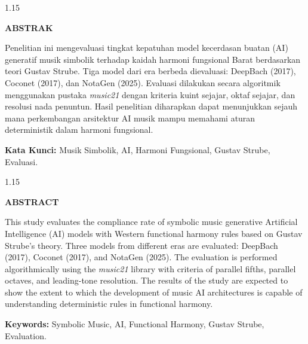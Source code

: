 \newpage
\begin{spacing}{1.15}
\begin{center}
    \textbf{ABSTRAK}
\end{center}

Penelitian ini mengevaluasi tingkat kepatuhan model kecerdasan buatan (AI) generatif musik simbolik terhadap kaidah harmoni fungsional Barat berdasarkan teori Gustav Strube. Tiga model dari era berbeda dievaluasi: DeepBach (2017), Coconet (2017), dan NotaGen (2025). Evaluasi dilakukan secara algoritmik menggunakan pustaka \textit{music21} dengan kriteria kuint sejajar, oktaf sejajar, dan resolusi nada penuntun. Hasil penelitian diharapkan dapat menunjukkan sejauh mana perkembangan arsitektur AI musik mampu memahami aturan deterministik dalam harmoni fungsional.\par

\textbf{Kata Kunci:} Musik Simbolik, AI, Harmoni Fungsional, Gustav Strube, Evaluasi.
\end{spacing}

\newpage
\begin{spacing}{1.15}
\begin{center}
    \textbf{ABSTRACT}
\end{center}

This study evaluates the compliance rate of symbolic music generative Artificial Intelligence (AI) models with Western functional harmony rules based on Gustav Strube's theory. Three models from different eras are evaluated: DeepBach (2017), Coconet (2017), and NotaGen (2025). The evaluation is performed algorithmically using the \textit{music21} library with criteria of parallel fifths, parallel octaves, and leading-tone resolution. The results of the study are expected to show the extent to which the development of music AI architectures is capable of understanding deterministic rules in functional harmony.\par

\textbf{Keywords:} Symbolic Music, AI, Functional Harmony, Gustav Strube, Evaluation.
\end{spacing}
\newpage
